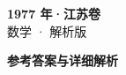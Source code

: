 \documentclass[zihao=-4, a4paper]{ctexart}
\begin{document}
\begin{center}
  {\Large\bfseries 1977 年·江苏卷}\\[4pt]
  {\large 数学 · 解析版}
\end{center}
\medskip
{}

\clearpage
{}
\begin{center}{\Large\bfseries 参考答案与详细解析}\end{center}
\medskip

\end{document}
